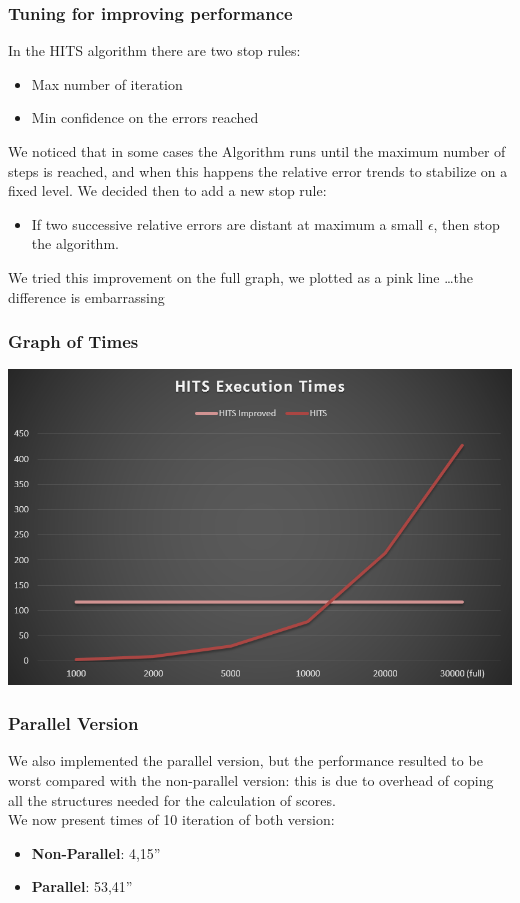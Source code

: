 \documentclass{beamer}
\begin{document}
\begin{frame}
\frametitle{Tuning for improving performance}
In the HITS algorithm there are two stop rules:
\begin{itemize}
\item Max number of iteration
\item Min confidence on the errors reached
\end{itemize}
\medskip
We noticed that in some cases the Algorithm runs until the maximum number of steps is reached, and when this happens the relative error trends to stabilize on a fixed level. We decided then to add a new stop rule: \\
\begin{itemize}
\item If two successive relative errors are distant at maximum a small $\epsilon$, then stop the algorithm.
\end{itemize}
We tried this improvement on the full graph, we plotted as a pink line \dots the difference is embarrassing 
\end{frame}

\begin{frame}
\frametitle{Graph of Times}
\includegraphics[scale=0.5]{img/Ranking/HITS.PNG} 
\end{frame}

\begin{frame}
\frametitle{Parallel Version}
We also implemented the parallel version, but the performance resulted to be worst compared with the non-parallel version: this is due to overhead of coping all the structures needed for the calculation of scores.\\
\medskip
We now present times of 10 iteration of both version:
\begin{itemize}
\item \textbf{Non-Parallel}: 4,15''
\item \textbf{Parallel}: 53,41''
\end{itemize} 
\end{frame}
\end{document}
